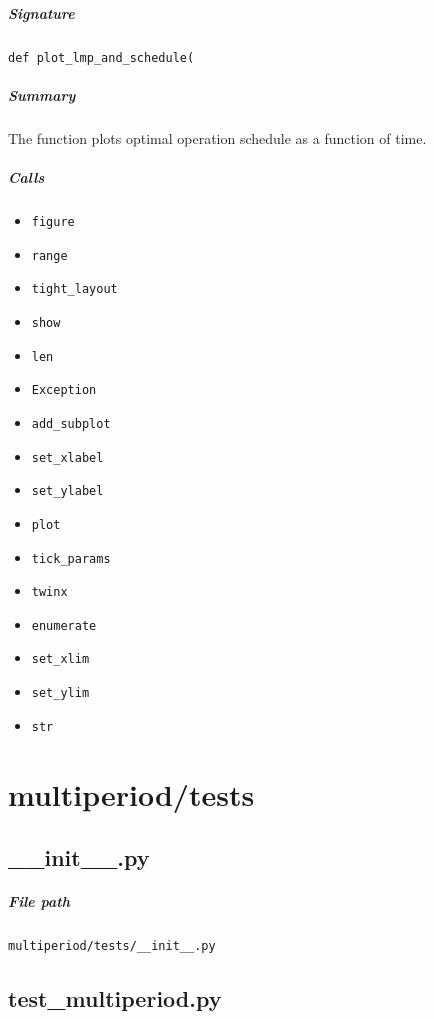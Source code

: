 \documentclass[11pt]{report}
\begin{document}
\paragraph{Signature} \texttt{def plot\_lmp\_and\_schedule(}
\paragraph{Summary} The function plots optimal operation schedule as a function of time.
\paragraph{Calls}
\begin{itemize}[leftmargin=*]
  \item \texttt{figure}
  \item \texttt{range}
  \item \texttt{tight\_layout}
  \item \texttt{show}
  \item \texttt{len}
  \item \texttt{Exception}
  \item \texttt{add\_subplot}
  \item \texttt{set\_xlabel}
  \item \texttt{set\_ylabel}
  \item \texttt{plot}
  \item \texttt{tick\_params}
  \item \texttt{twinx}
  \item \texttt{enumerate}
  \item \texttt{set\_xlim}
  \item \texttt{set\_ylim}
  \item \texttt{str}
\end{itemize}

\chapter{multiperiod/tests}
\section{\_\_init\_\_.py}
\label{file:multiperiod-tests-__init__.py}
\paragraph{File path} \texttt{multiperiod/tests/\_\_init\_\_.py}

\section{test\_multiperiod.py}
\label{file:multiperiod-tests-test_multiperiod.py}
\end{document}
